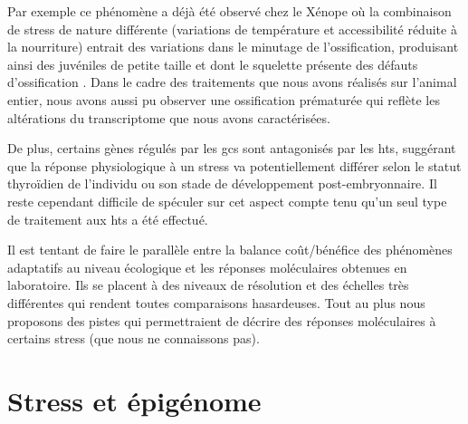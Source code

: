 \documentclass[../main.tex]{subfiles}
\begin{document}
Par exemple ce phénomène a déjà été observé chez le Xénope où la combinaison de stress de nature différente (variations de température et accessibilité réduite à la nourriture) entrait des variations dans le minutage de l’ossification, produisant ainsi des juvéniles de petite taille et dont le squelette présente des défauts d'ossification \citep{Gomez-Mestre2010}.
Dans le cadre des traitements que nous avons réalisés sur l'animal entier, nous avons aussi pu observer une ossification prématurée qui reflète les altérations du transcriptome que nous avons caractérisées.
\par
De plus, certains gènes régulés par les \glspl{gc} sont antagonisés par les \glspl{ht}, suggérant que la réponse physiologique à un stress va potentiellement différer selon le statut thyroïdien de l'individu ou son stade de développement post-embryonnaire.
Il reste cependant difficile de spéculer sur cet aspect compte tenu qu'un seul type de traitement aux \glspl{ht} a été effectué.
\par
Il est tentant de faire le parallèle entre la balance coût/bénéfice des phénomènes adaptatifs au niveau écologique et les réponses moléculaires obtenues en laboratoire.
Ils se placent à des niveaux de résolution et des échelles très différentes qui rendent toutes comparaisons hasardeuses.
Tout au plus nous proposons des pistes qui permettraient de décrire des réponses moléculaires à certains stress (que nous ne connaissons pas).


\section{Stress et épigénome}
\end{document}
